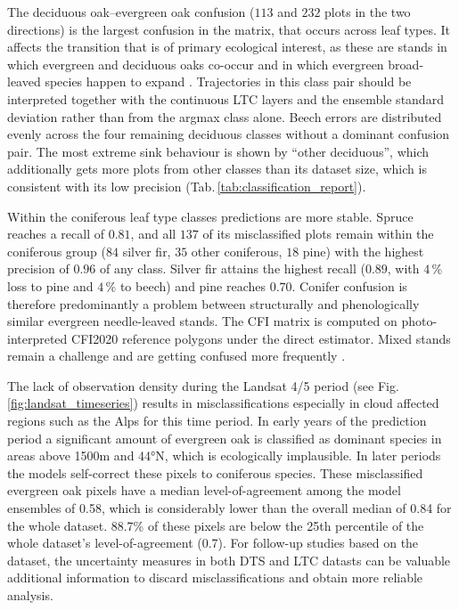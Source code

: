 \documentclass[essd, manuscript]{copernicus}
\begin{document}
The deciduous oak--evergreen oak confusion ($113$ and $232$ plots in the two directions) is the largest confusion in the matrix, that occurs across leaf types. It affects the transition that is of primary ecological interest, as these are stands in which evergreen and deciduous oaks co-occur and in which evergreen broad-leaved species happen to expand \citep{conedera_drivers_2018,alessi_ancient_2019}. Trajectories in this class pair should be interpreted together with the continuous LTC layers and the ensemble standard deviation rather than from the argmax class alone. Beech errors are distributed evenly across the four remaining deciduous classes without a dominant confusion pair.
The most extreme sink behaviour is shown by ``other deciduous'', which additionally gets more plots from other classes than its dataset size, which is consistent with its low precision (Tab.\,\ref{tab:classification_report}). %

Within the coniferous leaf type classes predictions are more stable. Spruce reaches a recall of $0.81$, and all $137$ of its misclassified plots remain within the coniferous group ($84$ silver fir, $35$ other coniferous, $18$ pine) with the highest precision of $0.96$ of any class. Silver fir attains the highest recall ($0.89$, with $4\,\%$ loss to pine and $4\,\%$ to beech) and pine reaches $0.70$. Conifer confusion is therefore predominantly a problem between structurally and phenologically similar evergreen needle-leaved stands. The CFI matrix is computed on photo-interpreted CFI2020 reference polygons under the direct estimator. Mixed stands remain a challenge and are getting confused more frequently \citep{blickensdorfer_national_2024}.%

The lack of observation density during the Landsat 4/5 period (see Fig.\,\ref{fig:landsat_timeseries}) results in misclassifications especially in cloud affected regions such as the Alps for this time period. In early years of the prediction period a significant amount of evergreen oak is classified as dominant species in areas above 1500m and 44°N, which is ecologically implausible. In later periods the models self-correct these pixels to coniferous species. These misclassified evergreen oak pixels have a median level-of-agreement among the model ensembles of 0.58, which is considerably lower than the overall median of 0.84 for the whole dataset. 88.7\% of these pixels are below the 25th percentile of the whole dataset's level-of-agreement (0.7). For follow-up studies based on the dataset, the uncertainty measures in both DTS and LTC datasts can be valuable additional information to discard misclassifications and obtain more reliable analysis.
\end{document}
